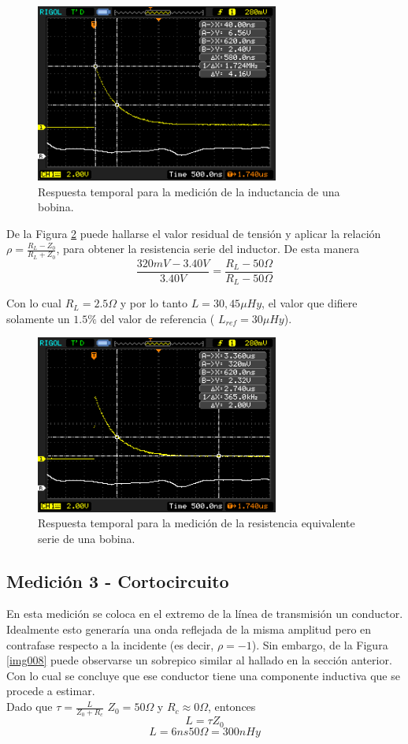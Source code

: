 \documentclass[a4paper,10pt]{article}
\begin{document}
		\begin{figure}[!htb]
			\centering
			\includegraphics[width=8cm]
			{Imagenes/InductorL.png}
			\caption{Respuesta temporal para la medici\'on de la inductancia 
			de una bobina.}
			\label{img006}
		\end{figure}

	\indent De la Figura \ref{img007} puede hallarse el valor residual de 
	tensi\'on y aplicar la relaci\'on  $\rho=\frac{R_L-Z_0}{R_L+Z_0}$, para 
	obtener la resistencia serie del inductor. De esta manera 
	$$\frac{320mV-3.40V}{3.40V}=\frac{R_L-50\Omega}{R_L-50\Omega}$$
	
	\indent Con lo cual $R_L=2.5\Omega$ y por lo tanto $L=30,45\mu Hy$, el 
	valor que difiere solamente un $1.5\% $ del valor de referencia (
	$L_{ref}=30\mu Hy$).
	
		\begin{figure}[!htb]
			\centering
			\includegraphics[width=8cm]
			{Imagenes/InductorR.png}
			\caption{Respuesta temporal para la medici\'on de la resistencia 
			equivalente serie de una bobina.}
			\label{img007}
		\end{figure}			
	
	
	\subsection{Medición 3 - Cortocircuito}
	\indent En esta medici\'on se coloca en el extremo de la l\'inea de 
	transmisi\'on un conductor. Idealmente esto generar\'ia una onda reflejada
	de la misma amplitud pero en contrafase respecto a la incidente (es decir,
	$\rho=-1$). Sin embargo, de la Figura \ref{img008} puede observarse un 
	sobrepico similar al hallado en la secci\'on anterior. Con lo cual se 
	concluye que ese conductor tiene una componente inductiva que se procede a
	estimar. \\
	\indent Dado que $\tau=\frac{L}{Z_0+R_c}$ $Z_0=50\Omega$ y 
	$R_c\approx 0\Omega$, entonces
	$$L=\tau Z_0$$
	$$L=6ns 50\Omega=300nHy$$
\end{document}
